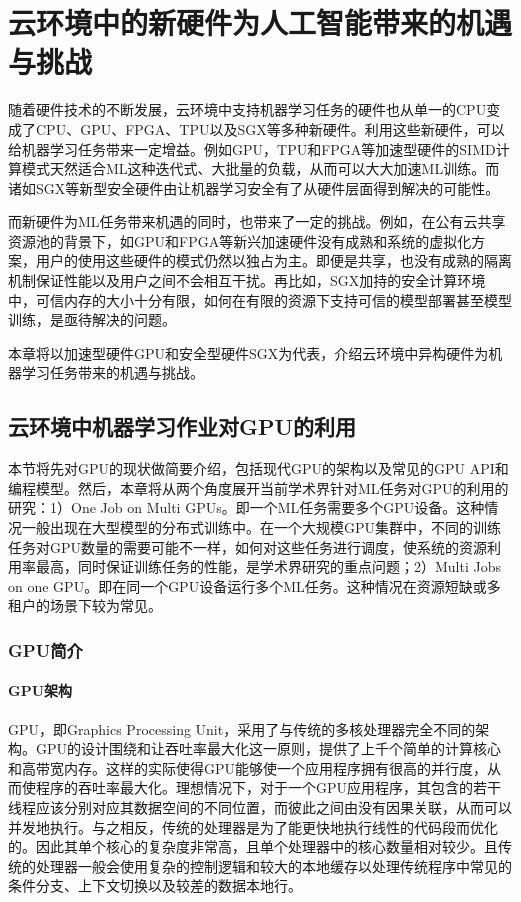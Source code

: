 
\chapter{云环境中的新硬件为人工智能带来的机遇与挑战}
随着硬件技术的不断发展，云环境中支持机器学习任务的硬件也从单一的CPU变成了CPU、GPU、FPGA\parencite{putnam2016a}、TPU\parencite{cass2019taking}以及SGX\parencite{costan2016intel}等多种新硬件。利用这些新硬件，可以给机器学习任务带来一定增益。例如GPU，TPU和FPGA等加速型硬件的SIMD计算模式天然适合ML这种迭代式、大批量的负载，从而可以大大加速ML训练。而诸如SGX等新型安全硬件由让机器学习安全有了从硬件层面得到解决的可能性。

而新硬件为ML任务带来机遇的同时，也带来了一定的挑战。例如，在公有云共享资源池的背景下，如GPU和FPGA等新兴加速硬件没有成熟和系统的虚拟化方案，用户的使用这些硬件的模式仍然以独占为主。即便是共享，也没有成熟的隔离机制保证性能以及用户之间不会相互干扰。再比如，SGX加持的安全计算环境中，可信内存的大小十分有限，如何在有限的资源下支持可信的模型部署甚至模型训练，是亟待解决的问题。

本章将以加速型硬件GPU和安全型硬件SGX为代表，介绍云环境中异构硬件为机器学习任务带来的机遇与挑战。

\section{云环境中机器学习作业对GPU的利用}

本节将先对GPU的现状做简要介绍，包括现代GPU的架构以及常见的GPU API和编程模型。然后，本章将从两个角度展开当前学术界针对ML任务对GPU的利用的研究：1）One Job on Multi GPUs。即一个ML任务需要多个GPU设备。这种情况一般出现在大型模型的分布式训练中。在一个大规模GPU集群中，不同的训练任务对GPU数量的需要可能不一样，如何对这些任务进行调度，使系统的资源利用率最高，同时保证训练任务的性能，是学术界研究的重点问题；2）Multi Jobs on one GPU。即在同一个GPU设备运行多个ML任务。这种情况在资源短缺或多租户的场景下较为常见。

\subsection{GPU简介}

\subsubsection{GPU架构}
GPU，即Graphics Processing Unit，采用了与传统的多核处理器完全不同的架构\parencite{hong2017gpu}。GPU的设计围绕和让吞吐率最大化这一原则，提供了上千个简单的计算核心和高带宽内存。这样的实际使得GPU能够使一个应用程序拥有很高的并行度，从而使程序的吞吐率最大化。理想情况下，对于一个GPU应用程序，其包含的若干线程应该分别对应其数据空间的不同位置，而彼此之间由没有因果关联，从而可以并发地执行。与之相反，传统的处理器是为了能更快地执行线性的代码段而优化的。因此其单个核心的复杂度非常高，且单个处理器中的核心数量相对较少。且传统的处理器一般会使用复杂的控制逻辑和较大的本地缓存以处理传统程序中常见的条件分支、上下文切换以及较差的数据本地行。

